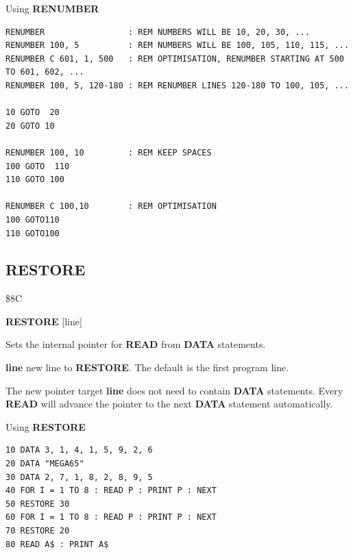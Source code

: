 \begin{description}[leftmargin=2cm,style=nextline]
\item [Examples:] Using {\bf RENUMBER}

\begin{tcolorbox}[colback=black,coltext=white]
\verbatimfont{\codefont}
\begin{verbatim}
RENUMBER                 : REM NUMBERS WILL BE 10, 20, 30, ...
RENUMBER 100, 5          : REM NUMBERS WILL BE 100, 105, 110, 115, ...
RENUMBER C 601, 1, 500   : REM OPTIMISATION, RENUMBER STARTING AT 500 TO 601, 602, ...
RENUMBER 100, 5, 120-180 : REM RENUMBER LINES 120-180 TO 100, 105, ...

10 GOTO  20
20 GOTO 10

RENUMBER 100, 10         : REM KEEP SPACES
100 GOTO  110
110 GOTO 100

RENUMBER C 100,10        : REM OPTIMISATION
100 GOTO110
110 GOTO100
\end{verbatim}
\end{tcolorbox}
\end{description}


\newpage
\subsection{RESTORE}
\begin{description}[leftmargin=2cm,style=nextline]
\item [Token:]    \$8C

\item [Format:]   {\bf RESTORE} [line]

\item [Usage:]    Sets the internal pointer for {\bf READ} from {\bf DATA} statements.

                  {\bf line} new line to {\bf RESTORE}. The default is the first program line.

\item [Remarks:]  The new pointer target {\bf line} does not need to contain {\bf DATA} statements. Every {\bf READ} will advance the pointer to the next {\bf DATA} statement automatically.

\item [Example:]  Using {\bf RESTORE}

\begin{tcolorbox}[colback=black,coltext=white]
\verbatimfont{\codefont}
\begin{verbatim}
10 DATA 3, 1, 4, 1, 5, 9, 2, 6
20 DATA "MEGA65"
30 DATA 2, 7, 1, 8, 2, 8, 9, 5
40 FOR I = 1 TO 8 : READ P : PRINT P : NEXT
50 RESTORE 30
60 FOR I = 1 TO 8 : READ P : PRINT P : NEXT
70 RESTORE 20
80 READ A$ : PRINT A$
\end{verbatim}
\end{tcolorbox}
\end{description}

